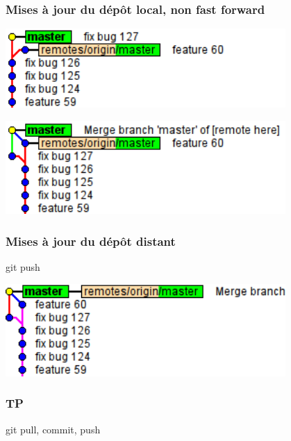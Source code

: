 \begin{frame}[fragile]\frametitle{Mises à jour du dépôt local, non fast forward}
  \begin{center}
    \includegraphics[width=0.8\textwidth]{./images/merge-3.png}
  \end{center}
  \pause
  \hfill
  \begin{center}
    \includegraphics[width=0.8\textwidth]{./images/merge-4.png}
  \end{center}
\end{frame}
\begin{frame}[fragile]\frametitle{Mises à jour du dépôt distant}
  \alert{git push}
  \hfill
  \begin{center}
    \includegraphics[width=0.8\textwidth]{./images/merge-5.png}
  \end{center}
\end{frame}
\begin{frame}\frametitle{TP}
  git pull, commit, push
\end{frame}
